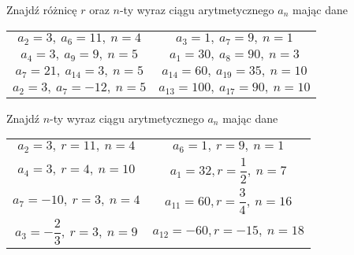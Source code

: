 \documentclass[a4paper,12pt,leqno,fleqn]{article}
\begin{document}
\newpage
Znajdź różnicę $r$ oraz $n$-ty wyraz ciągu arytmetycznego $a_n$ mając dane

\begin{tabularx}{\linewidth}{@{}XX@{}}

  \begin{equation}
    a_2=3,\:a_6=11,\:n=4
  \end{equation}
&
  \begin{equation}
    a_3=1,\:a_7=9,\:n=1
  \end{equation}
\\
  \begin{equation}
    a_4=3,\:a_9=9,\:n=5
  \end{equation}
&
  \begin{equation}
    a_1=30,\:a_8=90,\:n=3
  \end{equation}
\\
  \begin{equation}
    a_7=21,\:a_{14}=3,\:n=5
  \end{equation}
&
  \begin{equation}
    a_{14}=60,\:a_{19}=35,\:n=10
  \end{equation}
\\
  \begin{equation}
    a_2=3,\:a_7=-12,\:n=5
  \end{equation}
&
  \begin{equation}
    a_{13}=100,\:a_{17}=90,\:n=10
  \end{equation}

\end{tabularx}

\vspace{20pt}
Znajdź $n$-ty wyraz ciągu arytmetycznego $a_n$ mając dane

\begin{tabularx}{\linewidth}{@{}XX@{}}

  \begin{equation}
    a_2=3,\:r=11,\:n=4
  \end{equation}
&
  \begin{equation}
    a_6=1,\:r=9,\:n=1
  \end{equation}
\\
  \begin{equation}
    a_4=3,\:r=4,\:n=10
  \end{equation}
&
  \begin{equation}
    a_1=32,r=\frac{1}{2},\:n=7
  \end{equation}
\\
  \begin{equation}
    a_7=-10,\:r=3,\:n=4
  \end{equation}
&
  \begin{equation}
    a_{11}=60,r=\frac{3}{4},\:n=16
  \end{equation}
\\
  \begin{equation}
    a_3=-\frac{2}{3},\:r=3,\:n=9
  \end{equation}
&
  \begin{equation}
    a_{12}=-60,r=-15,\:n=18
  \end{equation}

\end{tabularx}
\end{document}
